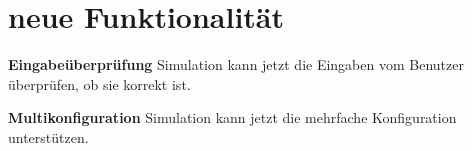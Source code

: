 \section{neue Funktionalität}

\textbf{Eingabeüberprüfung}
Simulation kann jetzt die Eingaben vom Benutzer überprüfen, ob sie korrekt ist.

\textbf{Multikonfiguration}
Simulation kann jetzt die mehrfache Konfiguration unterstützen.
